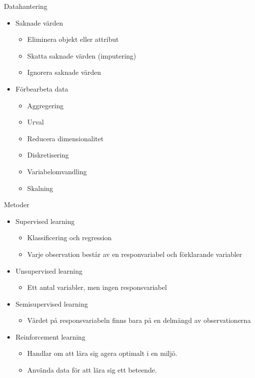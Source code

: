 \documentclass[10pt,english]{beamer}
\begin{document}
\begin{frame}{Datahantering}
    \begin{itemize}
        \item Saknade värden
        \begin{itemize}
            \item Eliminera objekt eller attribut
            \item Skatta saknade värden (imputering)
            \item Ignorera saknade värden
        \end{itemize}
        \item Förbearbeta data
        \begin{itemize}
            \item Aggregering
            \item Urval
            \item Reducera dimensionalitet
            \item Diskretisering
            \item Variabelomvandling
            \item Skalning
        \end{itemize}
    \end{itemize}
\end{frame}

\begin{frame}{Metoder}
    \begin{itemize}
        \item Supervised learning
        \begin{itemize}
            \item Klassificering och regression
            \item Varje observation består av en responvariabel och förklarande variabler
        \end{itemize}
        \item Unsupervised learning
        \begin{itemize}
            \item Ett antal variabler, men ingen responsvariabel
        \end{itemize}
        \item Semisupervised learning
        \begin{itemize}
            \item Värdet på responsvariabeln finns bara på en delmängd av observationerna
        \end{itemize}
        \item Reinforcement learning
        \begin{itemize}
            \item Handlar om att lära sig agera optimalt i en miljö.
            \item Använda data för att lära sig ett beteende.
        \end{itemize}
    \end{itemize}
\end{frame}
\end{document}
